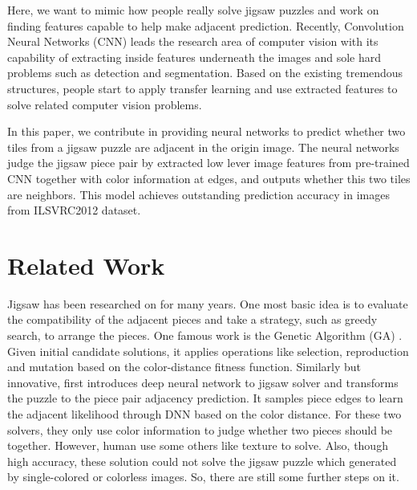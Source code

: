 \documentclass{article}
\begin{document}
Here, we want to mimic how people really solve jigsaw puzzles and work on finding features capable to help make adjacent prediction. Recently, Convolution Neural Networks (CNN) leads the research area of computer vision with its capability of extracting inside features underneath the images and sole hard problems such as detection\cite{redmon2017yolo9000} and segmentation\cite{he2017mask,yu2015multi}. Based on the existing tremendous structures, people start to apply transfer learning and use extracted features to solve related computer vision problems\cite{razavian2014cnn}.

In this paper, we contribute in providing neural networks to predict whether two tiles from a jigsaw puzzle are adjacent in the origin image. The neural networks judge the jigsaw piece pair by extracted low lever image features from pre-trained CNN together with color information at edges, and outputs whether this two tiles are neighbors. This model achieves outstanding prediction accuracy in images from ILSVRC2012 dataset\cite{ILSVRC15}.

\section{Related Work}

Jigsaw has been researched on for many years. One most basic idea is to evaluate the compatibility of the adjacent pieces and take a strategy, such as greedy search, to arrange the pieces. One famous work is the Genetic Algorithm (GA) \cite{sholomon2013genetic}. Given initial candidate solutions, it applies operations like selection, reproduction and mutation based on the color-distance fitness function. Similarly but innovative, \cite{sholomon2016dnn} first introduces deep neural network to jigsaw solver and transforms the puzzle to the piece pair adjacency prediction. It samples piece edges to learn the adjacent likelihood through DNN based on the color distance. For these two solvers, they only use color information to judge whether two pieces should be together. However, human use some others like texture to solve. Also, though high accuracy, these solution could not solve the jigsaw puzzle which generated by single-colored or colorless images. So, there are still some further steps on it.
\end{document}
